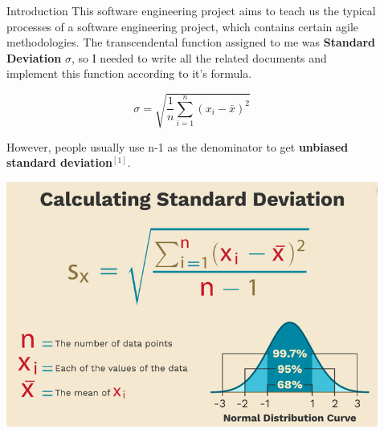 \documentclass[final]{beamer}
\newlength{\sepwid}
\newlength{\onecolwid}
\newlength{\twocolwid}
\begin{document}
\begin{frame}[t]
\begin{columns}[t]
\begin{column}{\onecolwid}
\begin{block}{Introduction}
This software engineering project aims to teach us the typical processes of a software engineering project, which contains certain agile methodologies. The transcendental function assigned to me was \textbf{Standard Deviation} $\sigma$, so I needed to write all the related documents and implement this function according to it's formula.
\begin{center}
\begin{equation}
     \sigma=\sqrt{\frac{1}{n}{\sum_{i=1}^n(x_i-\bar{x})^2}}
\end{equation}
\end{center}
\vspace{0.5cm}
However, people usually use n-1 as the denominator to get \textbf{unbiased standard deviation}$^{[1]}$.
\end{block}

\begin{center}
    \includegraphics[width=0.8\linewidth]{unbiasedStandardDeviation.png}
\end{center}

\end{column} %

\begin{column}{\sepwid}\end{column} %

\begin{column}{\twocolwid} %

\begin{columns}[t,totalwidth=\twocolwid] %


\end{columns}
\end{column}
\end{columns}
\end{frame}
\end{document}
